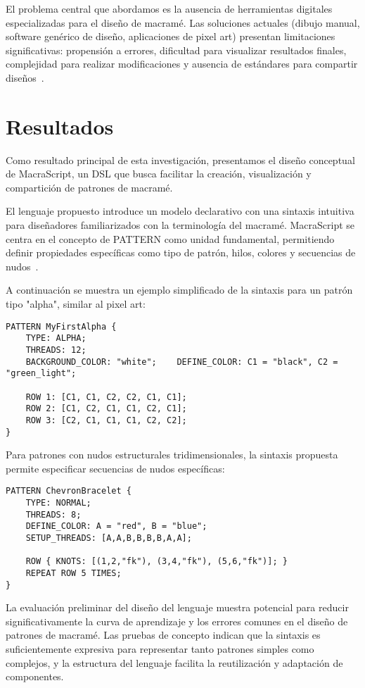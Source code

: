 \documentclass[conference]{IEEEtran}
\begin{document}
El problema central que abordamos es la ausencia de herramientas digitales especializadas para el diseño de macramé. Las soluciones actuales (dibujo manual, software genérico de diseño, aplicaciones de pixel art) presentan limitaciones significativas: propensión a errores, dificultad para visualizar resultados finales, complejidad para realizar modificaciones y ausencia de estándares para compartir diseños~\cite{owen1997}.

\section{Resultados}
Como resultado principal de esta investigación, presentamos el diseño conceptual de MacraScript, un DSL que busca facilitar la creación, visualización y compartición de patrones de macramé.

El lenguaje propuesto introduce un modelo declarativo con una sintaxis intuitiva para diseñadores familiarizados con la terminología del macramé. MacraScript se centra en el concepto de PATTERN como unidad fundamental, permitiendo definir propiedades específicas como tipo de patrón, hilos, colores y secuencias de nudos~\cite{voelter2013}.

A continuación se muestra un ejemplo simplificado de la sintaxis para un patrón tipo "alpha", similar al pixel art:

\begin{verbatim}
PATTERN MyFirstAlpha {
    TYPE: ALPHA;
    THREADS: 12;
    BACKGROUND_COLOR: "white";    DEFINE_COLOR: C1 = "black", C2 = "green_light";
    
    ROW 1: [C1, C1, C2, C2, C1, C1];
    ROW 2: [C1, C2, C1, C1, C2, C1];
    ROW 3: [C2, C1, C1, C1, C2, C2];
}
\end{verbatim}

Para patrones con nudos estructurales tridimensionales, la sintaxis propuesta permite especificar secuencias de nudos específicas:

\begin{verbatim}
PATTERN ChevronBracelet {
    TYPE: NORMAL;
    THREADS: 8;
    DEFINE_COLOR: A = "red", B = "blue";
    SETUP_THREADS: [A,A,B,B,B,B,A,A];

    ROW { KNOTS: [(1,2,"fk"), (3,4,"fk"), (5,6,"fk")]; }
    REPEAT ROW 5 TIMES;
}
\end{verbatim}

La evaluación preliminar del diseño del lenguaje muestra potencial para reducir significativamente la curva de aprendizaje y los errores comunes en el diseño de patrones de macramé. Las pruebas de concepto indican que la sintaxis es suficientemente expresiva para representar tanto patrones simples como complejos, y la estructura del lenguaje facilita la reutilización y adaptación de componentes.
\end{document}
